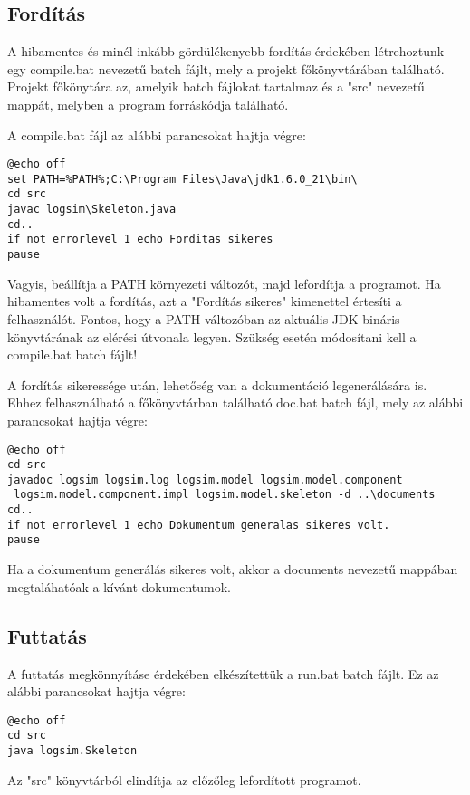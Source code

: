 \subsection{Fordítás}
A hibamentes és minél inkább gördülékenyebb fordítás érdekében létrehoztunk egy compile.bat nevezetű batch fájlt, mely a projekt főkönyvtárában található. Projekt főkönytára az, amelyik batch fájlokat tartalmaz és a "src" nevezetű mappát, melyben a program forráskódja található.

A compile.bat fájl az alábbi parancsokat hajtja végre:
\lstset{escapeinside=`', xleftmargin=10pt, frame=single, basicstyle=\ttfamily\footnotesize, language=sh}
\begin{lstlisting}
@echo off
set PATH=%PATH%;C:\Program Files\Java\jdk1.6.0_21\bin\
cd src
javac logsim\Skeleton.java
cd..
if not errorlevel 1 echo Forditas sikeres
pause
\end{lstlisting}
Vagyis, beállítja a PATH környezeti változót, majd lefordítja a programot. Ha hibamentes volt a fordítás, azt a "Fordítás sikeres" kimenettel értesíti a felhasználót.
Fontos, hogy a PATH változóban az aktuális JDK bináris könyvtárának az elérési útvonala legyen. Szükség esetén módosítani kell a compile.bat batch fájlt!


A fordítás sikeressége után, lehetőség van a dokumentáció legenerálására is. Ehhez felhasználható a főkönyvtárban található doc.bat batch fájl, mely az alábbi parancsokat hajtja végre:
\lstset{escapeinside=`', xleftmargin=10pt, frame=single, basicstyle=\ttfamily\footnotesize, language=sh}
\begin{lstlisting}
@echo off
cd src
javadoc logsim logsim.log logsim.model logsim.model.component
 logsim.model.component.impl logsim.model.skeleton -d ..\documents
cd..
if not errorlevel 1 echo Dokumentum generalas sikeres volt. 
pause
\end{lstlisting}
Ha a dokumentum generálás sikeres volt, akkor a documents nevezetű mappában megtaláhatóak a kívánt dokumentumok.



\subsection{Futtatás}
A futtatás megkönnyításe érdekében elkészítettük a run.bat batch fájlt.
Ez az alábbi parancsokat hajtja végre:
\lstset{escapeinside=`', xleftmargin=10pt, frame=single, basicstyle=\ttfamily\footnotesize, language=sh}
\begin{lstlisting}
@echo off
cd src
java logsim.Skeleton
\end{lstlisting}
Az "src" könyvtárból elindítja az előzőleg lefordított programot.


